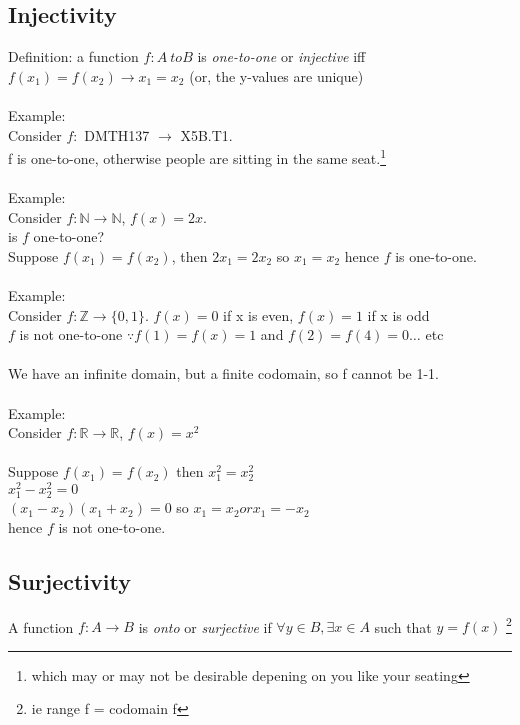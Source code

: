 \subsection{Injectivity}
Definition: a function $f: A\ to B$ is \emph{one-to-one} or \emph{injective} iff
$f(x_1) = f(x_2) \to x_1 = x_2$ (or, the y-values are unique) \\
\\
Example: \\
Consider $f:$ DMTH137 $\to$ X5B.T1. \\
f is one-to-one, otherwise people are sitting in the same seat.\footnote{which
may or may not be desirable depening on you like your seating} \\
\\
Example: \\
Consider $f: \mathbb{N} \to \mathbb{N}$, $f(x) = 2x$. \\
is $f$ one-to-one? \\
Suppose $f(x_1) = f(x_2)$, then $2x_1 = 2x_2$ so $x_1 = x_2$ hence $f$ is one-to-one. \\
 \\
Example: \\
Consider $f: \mathbb{Z} \to \{0,1\}$. $f(x) = 0$ if x is even, $f(x) = 1$ if x is odd \\

$f$ is not one-to-one $\because f(1) = f(x) = 1$ and $f(2) = f(4) = 0\ldots$ etc \\
\\
We have an infinite domain, but a finite codomain, so f cannot be 1-1. \\
\\
Example: \\
Consider $f: \mathbb{R} \to \mathbb{R}$, $f(x) = x^2$ \\
\\
Suppose $f(x_1) = f(x_2)$ then $x_1^{2} = x_2^{2}$ \\
$x_1^2 - x_2^2 = 0$ \\
$(x_1 - x_2)(x_1 + x_2) = 0$ so $x_1 = x_2 or x_1 = -x_2$ \\
hence $f$ is not one-to-one. \\

\subsection{Surjectivity}
A function $f: A \to B $ is \emph{onto} or \emph{surjective} if $\forall y \in B, \exists x \in A$
such that $y = f(x)$ \footnote{ie range f = codomain f}

